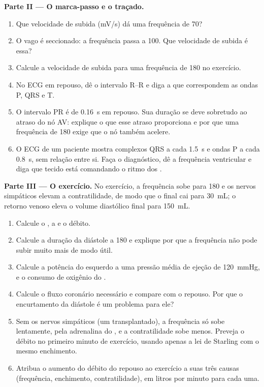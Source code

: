 \begin{problem}
\medskip
\noindent\textbf{Parte II --- O marca-passo e o traçado.}
\begin{enumerate}[resume]
  \item Que velocidade de subida (\unit{mV/s}) dá uma frequência de 70?
  \item O vago é seccionado: a frequência passa a 100. Que velocidade de
        subida é essa?
  \item Calcule a velocidade de subida para uma frequência de 180 no
        exercício.
  \item No ECG em repouso, dê o intervalo R--R e diga a que
        correspondem as ondas P, QRS e T.
  \item O intervalo PR é de \qty{0.16}{s} em repouso. Sua duração se
        deve sobretudo ao atraso do nó AV: explique o que esse atraso
        proporciona e por que uma frequência de 180 exige que o nó também
        acelere.
  \item O ECG de um paciente mostra complexos QRS a cada \qty{1.5}{s} e
        ondas P a cada \qty{0.8}{s}, sem relação entre si. Faça o
        diagnóstico, dê a frequência ventricular e diga que tecido está
        comandando o ritmo dos .
\end{enumerate}

\medskip
\noindent\textbf{Parte III --- O exercício.}
No exercício, a frequência sobe para 180 e os nervos simpáticos elevam a
contratilidade, de modo que o  final cai para
\qty{30}{mL}; o retorno venoso eleva o volume diastólico final para
\qty{150}{mL}.
\begin{enumerate}[resume]
  \item Calcule o , a  e o débito.
  \item Calcule a duração da diástole a 180 e explique por que a
        frequência não pode subir muito mais de modo útil.
  \item Calcule a potência do  esquerdo a uma pressão média de
        ejeção de \qty{120}{mmHg}, e o consumo de oxigênio do .
  \item Calcule o fluxo coronário necessário e compare com o repouso.
        Por que o encurtamento da diástole é um problema para ele?
  \item Sem os nervos simpáticos (um  transplantado), a
        frequência só sobe lentamente, pela adrenalina do , e a
        contratilidade sobe menos. Preveja o débito no primeiro minuto de
        exercício, usando apenas a lei de Starling com o mesmo
        enchimento.
  \item Atribua o aumento do débito do repouso ao exercício a suas três
        causas (frequência, enchimento, contratilidade), em litros por
        minuto para cada uma.
\end{enumerate}


\end{problem}
